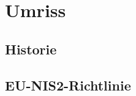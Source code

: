 \chapter{Umriss}\label{ch:umriss}

\section{Historie}\label{sec:historie}

\section{EU-NIS2-Richtlinie}\label{sec:eu-nis2-richtlinie}
